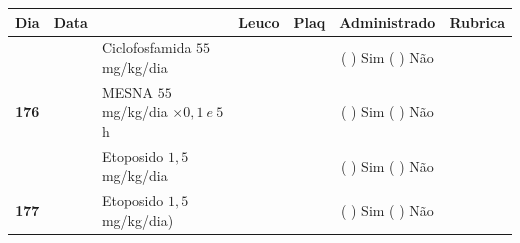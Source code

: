 \documentclass[11pt,a4paper,oldfontcommands]{memoir}
\begin{document}
\begin{center}
\begin{longtable}{p{1cm}c|p{5cm}|p{1.5cm}p{1.5cm}|c|c}
	\hline
	\multicolumn{1}{c|}{\multirow{1}{*}{\textbf{Dia}}}&{Data}&{}&\multicolumn{1}{c|}{Leuco}&\multicolumn{1}{c|}{Plaq}&{Administrado}&{Rubrica} \\
    \hline
    \multicolumn{1}{c|}{\multirow{3}{*}{\textbf{176}}}&&{Ciclofosfamida \(55\) mg/kg/dia}&\multicolumn{1}{c|}{}&&{(  ) Sim (  ) Não}&\\
    \cline{4-5}
    \multicolumn{1}{c|}{}&&{MESNA \(55\) mg/kg/dia \(\times 0,1 \:e\: 5\)h}&&&{(  ) Sim (  ) Não}&\\
    \multicolumn{1}{c|}{}&&{Etoposido \(1,5\) mg/kg/dia}&&&{(  ) Sim (  ) Não}&\\
    \hline
    \multicolumn{1}{c|}{\multirow{1}{*}{\textbf{177}}}&&{Etoposido \(1,5\) mg/kg/dia)}&{}&&{(  ) Sim (  ) Não}&\\
    \hline
\end{longtable}
\end{center}
\end{document}

